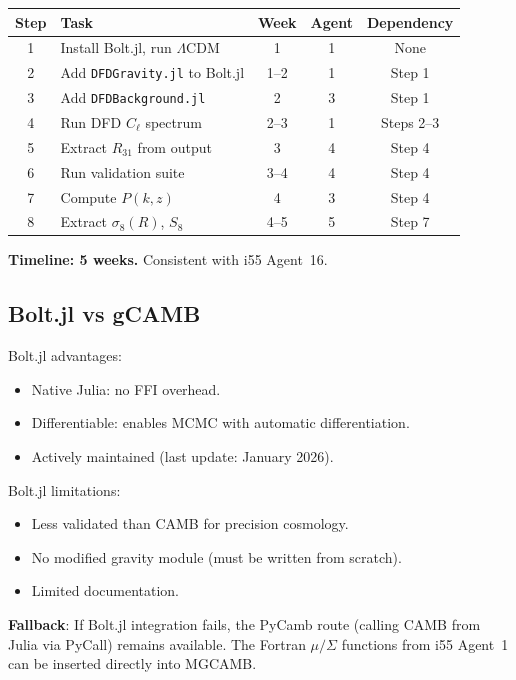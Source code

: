 \documentclass[11pt,a4paper]{article}
\begin{document}
\begin{center}
\begin{longtable}{clccc}
\toprule
\textbf{Step} & \textbf{Task} & \textbf{Week} & \textbf{Agent} & \textbf{Dependency} \\
\midrule
1 & Install Bolt.jl, run $\Lambda$CDM & 1 & 1 & None \\
2 & Add \texttt{DFDGravity.jl} to Bolt.jl & 1--2 & 1 & Step 1 \\
3 & Add \texttt{DFDBackground.jl} & 2 & 3 & Step 1 \\
4 & Run DFD $C_\ell$ spectrum & 2--3 & 1 & Steps 2--3 \\
5 & Extract $R_{31}$ from output & 3 & 4 & Step 4 \\
6 & Run validation suite & 3--4 & 4 & Step 4 \\
7 & Compute $P(k,z)$ & 4 & 3 & Step 4 \\
8 & Extract $\sigma_8(R)$, $S_8$ & 4--5 & 5 & Step 7 \\
\bottomrule
\end{longtable}
\end{center}

\textbf{Timeline: 5 weeks.} Consistent with i55 Agent~16.

\subsection{Bolt.jl vs gCAMB}

Bolt.jl advantages:
\begin{itemize}
\item Native Julia: no FFI overhead.
\item Differentiable: enables MCMC with automatic differentiation.
\item Actively maintained (last update: January 2026).
\end{itemize}

Bolt.jl limitations:
\begin{itemize}
\item Less validated than CAMB for precision cosmology.
\item No modified gravity module (must be written from scratch).
\item Limited documentation.
\end{itemize}

\textbf{Fallback}: If Bolt.jl integration fails, the PyCamb route (calling CAMB from Julia via PyCall) remains available. The Fortran $\mu/\Sigma$ functions from i55 Agent~1 can be inserted directly into MGCAMB.
\end{document}
